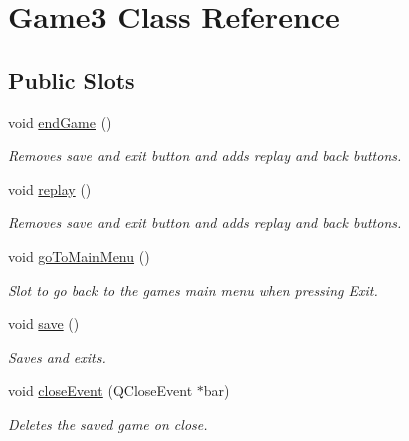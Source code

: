 \hypertarget{classGame3}{\section{\-Game3 \-Class \-Reference}
\label{classGame3}
}
\subsection*{\-Public \-Slots}
\begin{DoxyCompactItemize}
\item 
void \hyperlink{classGame3_a0a79ef23fdfd43052da0e31da7cf8172}{end\-Game} ()
\begin{DoxyCompactList}\small\item\em \-Removes save and exit button and adds replay and back buttons. \end{DoxyCompactList}\item 
void \hyperlink{classGame3_ab37e7d626fddb52e5488caef0e2eb551}{replay} ()
\begin{DoxyCompactList}\small\item\em \-Removes save and exit button and adds replay and back buttons. \end{DoxyCompactList}\item 
void \hyperlink{classGame3_ab5b41e8bcbaf0c2299f1c9c21660867e}{go\-To\-Main\-Menu} ()
\begin{DoxyCompactList}\small\item\em \-Slot to go back to the games main menu when pressing \-Exit. \end{DoxyCompactList}\item 
void \hyperlink{classGame3_aa53cda927c3a9797d8e2ce37e20daab1}{save} ()
\begin{DoxyCompactList}\small\item\em \-Saves and exits. \end{DoxyCompactList}\item 
void \hyperlink{classGame3_afd341ba6bd89317a7303eeb4d8147a7b}{close\-Event} (\-Q\-Close\-Event $\ast$bar)
\begin{DoxyCompactList}\small\item\em \-Deletes the saved game on close. \end{DoxyCompactList}\end{DoxyCompactItemize}
